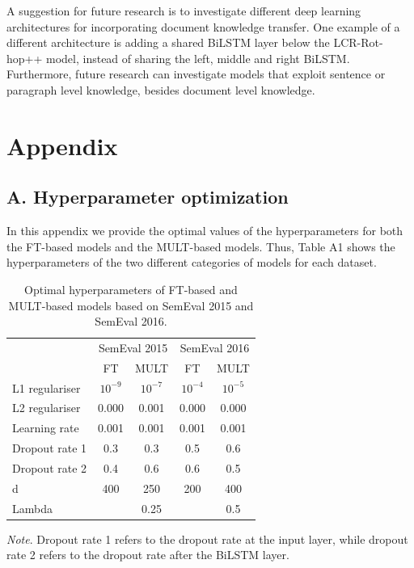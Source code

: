 \documentclass[runningheads]{llncs}
\begin{document}
A suggestion for future research is to investigate different deep learning architectures for incorporating document knowledge transfer. One example of a different architecture is adding a shared BiLSTM layer below the LCR-Rot-hop++ model, instead of sharing the left, middle and right BiLSTM. Furthermore, future research can investigate models that exploit sentence or paragraph level knowledge, besides document level knowledge.  




\section*{Appendix}
\subsection*{A. Hyperparameter optimization}
\renewcommand{\thefigure}{A\arabic{figure}}
\setcounter{figure}{0}
\renewcommand{\thetable}{A\arabic{table}}
\setcounter{table}{0}

In this appendix we provide the optimal values of the hyperparameters for both the FT-based models and the MULT-based models. Thus, Table A1 shows the hyperparameters of the two different categories of models for each dataset. 

\begin{table}[h]
\caption{Optimal hyperparameters of FT-based and MULT-based models based on SemEval 2015 and SemEval 2016.}
\label{tab:hyperparams}
\setlength{\tabcolsep}{24pt}
\begin{tabular}{@{}lcccc@{}}
\toprule
               & \multicolumn{2}{c}{SemEval 2015} & \multicolumn{2}{c}{SemEval 2016} \\ \cmidrule(l){2-5} 
               & FT              & MULT           & FT              & MULT           \\ \midrule
L1 regulariser & $10^{-9}$           & $10^{-7}$          & $10^{-4}$           & $10^{-5}$          \\
L2 regulariser & 0.000           & 0.001          & 0.000           & 0.000          \\
Learning rate  & 0.001           & 0.001          & 0.001           & 0.001          \\
Dropout rate 1 & 0.3             & 0.3            & 0.5             & 0.6            \\
Dropout rate 2 & 0.4             & 0.6            & 0.6             & 0.5            \\
d   & 400             & 250            & 200             & 400            \\
Lambda         &                 & 0.25           &                 & 0.5            \\ \bottomrule
\end{tabular}
\footnotesize\textit{Note}. Dropout rate 1 refers to the dropout rate at the input layer, while dropout rate 2 refers to the dropout rate after the BiLSTM layer.
\end{table}
\end{document}
